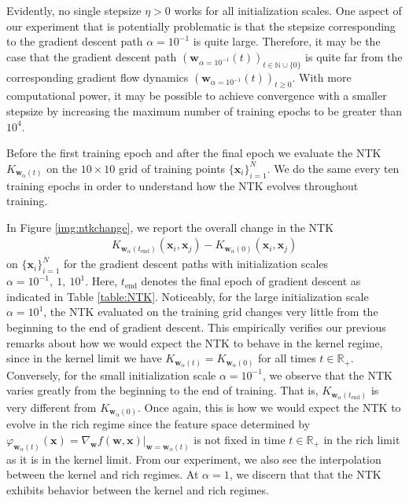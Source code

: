 \documentclass{article}
\begin{document}
Evidently, no single stepsize $\eta > 0$ works for all initialization scales. One aspect of our experiment that is potentially problematic is that the stepsize corresponding to the gradient descent path $\alpha = 10^{-1}$ is quite large. Therefore, it may be the case that the gradient descent path $(\boldsymbol{w}_{\alpha = 10^{-1}}(t))_{t \in \mathbb{N} \cup \{ 0 \}}$ is quite far from the corresponding gradient flow dynamics $(\boldsymbol{w}_{\alpha = 10^{-1}}(t))_{t\geq 0}$. With more computational power, it may be possible to achieve convergence with a smaller stepsize by increasing the maximum number of training epochs to be greater than $10^4$.

Before the first training epoch and after the final epoch we evaluate the NTK $K_{\boldsymbol{w}_{\alpha}(t)}$ on the $10 \times 10$ grid of training points $\{ \boldsymbol{x}_i \}_{i=1}^N$. We do the same every ten training epochs in order to understand how the NTK evolves throughout training.

In Figure \ref{img:ntkchange}, we report the overall change in the NTK
\begin{align*}
   K_{\boldsymbol{w}_{\alpha}(t_{\text{end}})}(\boldsymbol{x}_i, \boldsymbol{x}_j) -  K_{\boldsymbol{w}_{\alpha}(0)}(\boldsymbol{x}_i, \boldsymbol{x}_j)
\end{align*}
on $\{ \boldsymbol{x}_i \}_{i=1}^N$ for the gradient descent paths with initialization scales $\alpha = 10^{-1}, \ 1, \ 10^1$. Here, $t_{\text{end}}$ denotes the final epoch of gradient descent as indicated in Table \ref{table:NTK}. Noticeably, for the large initialization scale $\alpha = 10^1$, the NTK evaluated on the training grid changes very little from the beginning to the end of gradient descent. This empirically verifies our previous remarks about how we would expect the NTK to behave in the kernel regime, since in the kernel limit we have $K_{\boldsymbol{w}_{\alpha}(t)} = K_{\boldsymbol{w}_{\alpha}(0)}$ for all times $t \in \mathbb{R}_+$. Conversely, for the small initialization scale $\alpha = 10^{-1}$, we observe that the NTK varies greatly from the beginning to the end of training. That is, $K_{\boldsymbol{w}_{\alpha}(t_{\text{end}})}$ is very different from $K_{\boldsymbol{w}_{\alpha}(0)}$. Once again, this is how we would expect the NTK to evolve in the rich regime since the feature space determined by $\varphi_{\boldsymbol{w}_{\alpha}(t)}(\boldsymbol{x}) = \nabla_{\boldsymbol{w}}f(\boldsymbol{w}, \boldsymbol{x})|_{\boldsymbol{w} = \boldsymbol{w}_{\alpha}(t)}$ is not fixed in time $t \in \mathbb{R}_+$ in the rich limit as it is in the kernel limit. From our experiment, we also see the interpolation between the kernel and rich regimes. At $\alpha = 1$, we discern that that the NTK exhibits behavior between the kernel and rich regimes.
\end{document}
